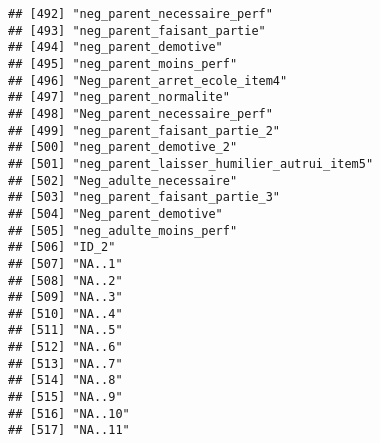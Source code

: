 \documentclass[
]{article}
\begin{document}
\begin{verbatim}
## [492] "neg_parent_necessaire_perf"                          
## [493] "neg_parent_faisant_partie"                           
## [494] "neg_parent_demotive"                                 
## [495] "neg_parent_moins_perf"                               
## [496] "Neg_parent_arret_ecole_item4"                        
## [497] "neg_parent_normalite"                                
## [498] "Neg_parent_necessaire_perf"                          
## [499] "neg_parent_faisant_partie_2"                         
## [500] "neg_parent_demotive_2"                               
## [501] "neg_parent_laisser_humilier_autrui_item5"            
## [502] "Neg_adulte_necessaire"                               
## [503] "neg_parent_faisant_partie_3"                         
## [504] "Neg_parent_demotive"                                 
## [505] "neg_adulte_moins_perf"                               
## [506] "ID_2"                                                
## [507] "NA..1"                                               
## [508] "NA..2"                                               
## [509] "NA..3"                                               
## [510] "NA..4"                                               
## [511] "NA..5"                                               
## [512] "NA..6"                                               
## [513] "NA..7"                                               
## [514] "NA..8"                                               
## [515] "NA..9"                                               
## [516] "NA..10"                                              
## [517] "NA..11"
\end{verbatim}
\end{document}
